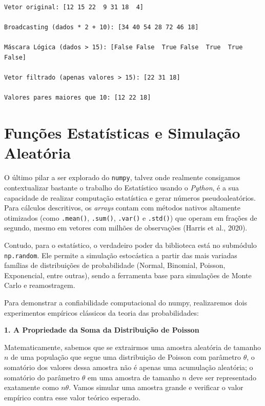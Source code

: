 \documentclass[
  brazilian,
  letterpaper,
  DIV=11,
  numbers=noendperiod]{scrreprt}
\begin{document}
\begin{verbatim}
Vetor original: [12 15 22  9 31 18  4]

Broadcasting (dados * 2 + 10): [34 40 54 28 72 46 18]

Máscara Lógica (dados > 15): [False False  True False  True  True False]

Vetor filtrado (apenas valores > 15): [22 31 18]

Valores pares maiores que 10: [12 22 18]
\end{verbatim}

\section{Funções Estatísticas e Simulação
Aleatória}\label{funuxe7uxf5es-estatuxedsticas-e-simulauxe7uxe3o-aleatuxf3ria}

O último pilar a ser explorado do \texttt{numpy}, talvez onde realmente
consigamos contextualizar bastante o trabalho do Estatístico usando o
\emph{Python}, é a sua capacidade de realizar computação estatística e
gerar números pseudoaleatórios. Para cálculos descritivos, os
\emph{arrays} contam com métodos nativos altamente otimizados (como
\texttt{.mean()}, \texttt{.sum()}, \texttt{.var()} e \texttt{.std()})
que operam em frações de segundo, mesmo em vetores com milhões de
observações (Harris et al., 2020).

Contudo, para o estatístico, o verdadeiro poder da biblioteca está no
submódulo \texttt{np.random}. Ele permite a simulação estocástica a
partir das mais variadas famílias de distribuições de probabilidade
(Normal, Binomial, Poisson, Exponencial, entre outras), sendo a
ferramenta base para simulações de Monte Carlo e reamostragem.

Para demonstrar a confiabilidade computacional do numpy, realizaremos
dois experimentos empíricos clássicos da teoria das probabilidades:

\textbf{1. A Propriedade da Soma da Distribuição de Poisson}

Matematicamente, sabemos que se extrairmos uma amostra aleatória de
tamanho \(n\) de uma população que segue uma distribuição de Poisson com
parâmetro \(\theta\), o somatório dos valores dessa amostra não é apenas
uma acumulação aleatória; o somatório do parâmetro \(\theta\) em uma
amostra de tamanho \(n\) deve ser representado exatamente como
\(n\theta\). Vamos simular uma amostra grande e verificar o valor
empírico contra esse valor teórico esperado.
\end{document}
